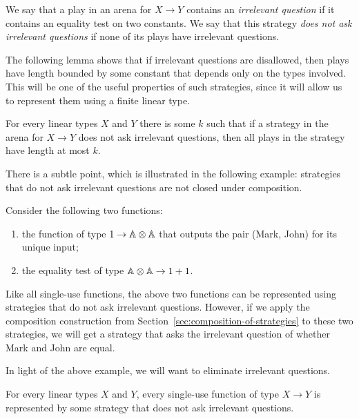 \begin{definition} We say that a play in an arena for $X \to Y$ contains an \emph{irrelevant question} if it contains an equality test on two constants. We say that this strategy \emph{does not ask irrelevant questions} if none of its plays have irrelevant questions.
\end{definition}
  
The following lemma shows that if irrelevant questions are disallowed, then plays have length bounded by some constant that depends only on the types involved. This will be one of the useful properties of such strategies, since it will allow us to represent them using a finite linear type.

\begin{lemma}\label{lem:no-irrelevant-questions-are-bounded}
    For every linear types $X$ and $Y$ there is some $k$ such that if a strategy in the arena for $X \to Y$ does not ask irrelevant questions, then all plays in the strategy have length at most $k$.
\end{lemma}

There is a subtle point, which is illustrated in the following example:  strategies that do not ask irrelevant questions are not closed under composition. 

\begin{example}
    Consider the  following two functions: 
    \begin{enumerate}
        \item the function of type  $1 \to \mathbb A \otimes \mathbb A$ that outputs the pair (Mark, John) for its unique input;
        \item the equality test of type $\mathbb A \otimes \mathbb A \to 1 + 1$.
    \end{enumerate}
    Like all single-use functions, the above two functions can be represented using strategies that do not ask irrelevant questions. However, if we apply the composition construction from Section~\ref{sec:composition-of-strategies} to these two strategies, we will get a strategy that asks the irrelevant question of whether Mark and John are equal. \exampleend
\end{example}

In light of the above example, we will want to eliminate irrelevant questions. 

\begin{lemma}\label{lem:eliminate-irrelevant-questions}
    For every linear types $X$ and $Y$, every single-use function of type  $X \to Y$ is represented by  some strategy that does not ask irrelevant questions.
\end{lemma}


